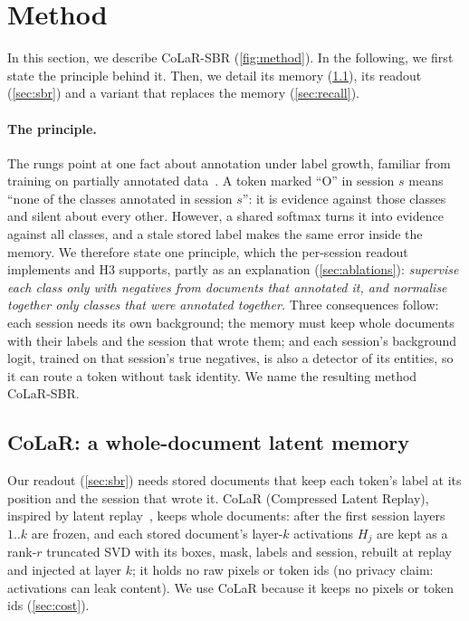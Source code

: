 \documentclass[10pt,twocolumn,letterpaper]{article}
\begin{document}
\section{Method}
\label{sec:design}
In this section, we describe CoLaR-SBR (\cref{fig:method}). In the following, we first state the principle behind it. Then, we detail its memory (\cref{sec:memory}), its readout (\cref{sec:sbr}) and a variant that replaces the memory (\cref{sec:recall}).

\paragraph{The principle.} The rungs point at one fact about annotation under label growth, familiar from training on partially annotated data~\citep{greenberg2018marginal}. A token marked ``O'' in session $s$ means ``none of the classes annotated in session $s$'': it is evidence against those classes and silent about every other. However, a shared softmax turns it into evidence against all classes, and a stale stored label makes the same error inside the memory. We therefore state one principle, which the per-session readout implements and H3 supports, partly as an explanation (\cref{sec:ablations}): \emph{supervise each class only with negatives from documents that annotated it, and normalise together only classes that were annotated together.} Three consequences follow: each session needs its own background; the memory must keep whole documents with their labels and the session that wrote them; and each session's background logit, trained on that session's true negatives, is also a detector of its entities, so it can route a token without task identity. We name the resulting method CoLaR-SBR.



\subsection{CoLaR: a whole-document latent memory}
\label{sec:memory}
Our readout (\cref{sec:sbr}) needs stored documents that keep each token's label at its position and the session that wrote it. CoLaR (Compressed Latent Replay), inspired by latent replay~\citep{hayes2020remind,pellegrini2020latent}, keeps whole documents: after the first session layers $1..k$ are frozen, and each stored document's layer-$k$ activations $H_j$ are kept as a rank-$r$ truncated SVD with its boxes, mask, labels and session, rebuilt at replay and injected at layer $k$; it holds no raw pixels or token ids (no privacy claim: activations can leak content). We use CoLaR because it keeps no pixels or token ids (\cref{sec:cost}).
\end{document}
